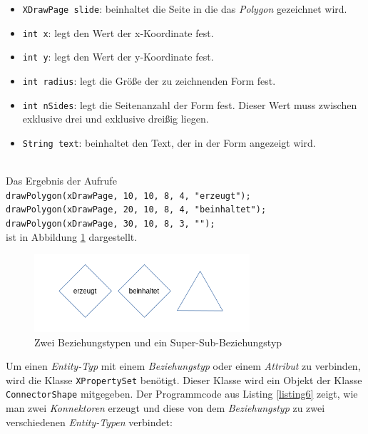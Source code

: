 \begin{itemize}
	\item \verb|XDrawPage slide|: beinhaltet die Seite in die das \textit{Polygon} gezeichnet wird.
	\item \verb|int x|: legt den Wert der x-Koordinate fest.
	\item \verb|int y|: legt den Wert der y-Koordinate fest.
	\item \verb|int radius|: legt die Größe der zu zeichnenden Form fest.
	\item \verb|int nSides|: legt die Seitenanzahl der Form fest. Dieser Wert muss zwischen exklusive drei und exklusive dreißig liegen.
	\item \verb|String text|: beinhaltet den Text, der in der Form angezeigt wird.  
\end{itemize}

\noindent
\hon{}
\\
\noindent
Das Ergebnis der Aufrufe \\
\verb|drawPolygon(xDrawPage, 10, 10, 8, 4, "erzeugt");| 
\\ \verb|drawPolygon(xDrawPage, 20, 10, 8, 4, "beinhaltet");| \\ \verb|drawPolygon(xDrawPage, 30, 10, 8, 3, "");| \\
ist in Abbildung \ref{ergebnis5} dargestellt.

\begin{figure}[h]
	\centering
	\includegraphics[width=8cm]{images/8.png}
	\caption{Zwei Beziehungstypen und ein Super-Sub-Beziehungstyp}
	\label{ergebnis5}
\end{figure}

\hon{}
\noindent
Um einen \textit{Entity-Typ} mit einem \textit{Beziehungstyp} oder einem \textit{Attribut} zu verbinden, wird die Klasse \verb|XPropertySet| benötigt. Dieser Klasse wird ein Objekt der Klasse \verb|ConnectorShape| mitgegeben. Der Programmcode aus Listing \ref{listing6} zeigt, wie man zwei \textit{Konnektoren} erzeugt und diese von dem \textit{Beziehungstyp} zu zwei verschiedenen \textit{Entity-Typen} verbindet:


